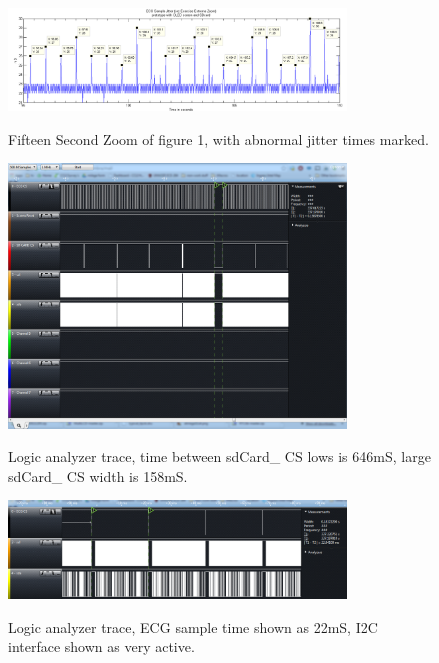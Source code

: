 \begin{figure}
	\begin{center}
		\label{fig:ecgJitterZoom}
		\includegraphics[scale=1,width=0.8\textwidth]{Images/ecgJitterZoom.png}
		\caption{Fifteen Second Zoom of figure 1, with abnormal jitter times marked.}
	\end{center}
\end{figure}

\begin{figure}
	\begin{center}
		\label{fig:ecgJitterZoom}
		\includegraphics[scale=1,width=0.8\textwidth]{Images/logicTrace_jitter.png}
		\caption{Logic analyzer trace, time between sdCard\_ CS lows is 646mS, large sdCard\_ CS width is 158mS.}
	\end{center}
\end{figure}


\begin{figure}
	\begin{center}
		\label{fig:ecgJitterZoom}
		\includegraphics[scale=1,width=0.8\textwidth]{Images/logicTrace_jitter_fullScale.png}
		\caption{Logic analyzer trace, ECG sample time shown as 22mS, I2C interface shown as very active.}
	\end{center}
\end{figure}


